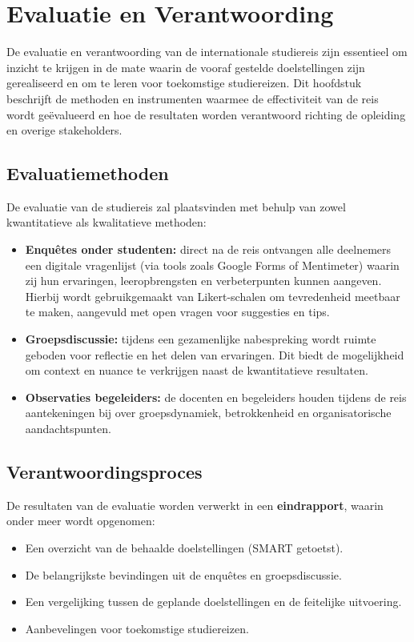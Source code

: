 \section{Evaluatie en Verantwoording}

De evaluatie en verantwoording van de internationale studiereis zijn essentieel om inzicht te krijgen in de mate waarin de vooraf gestelde doelstellingen zijn gerealiseerd en om te leren voor toekomstige studiereizen. Dit hoofdstuk beschrijft de methoden en instrumenten waarmee de effectiviteit van de reis wordt geëvalueerd en hoe de resultaten worden verantwoord richting de opleiding en overige stakeholders.

\subsection{Evaluatiemethoden}

De evaluatie van de studiereis zal plaatsvinden met behulp van zowel kwantitatieve als kwalitatieve methoden:

\begin{itemize}
	\item \textbf{Enquêtes onder studenten:} direct na de reis ontvangen alle deelnemers een digitale vragenlijst (via tools zoals Google Forms of Mentimeter) waarin zij hun ervaringen, leeropbrengsten en verbeterpunten kunnen aangeven. Hierbij wordt gebruikgemaakt van Likert-schalen om tevredenheid meetbaar te maken, aangevuld met open vragen voor suggesties en tips.
	\item \textbf{Groepsdiscussie:} tijdens een gezamenlijke nabespreking wordt ruimte geboden voor reflectie en het delen van ervaringen. Dit biedt de mogelijkheid om context en nuance te verkrijgen naast de kwantitatieve resultaten.
	\item \textbf{Observaties begeleiders:} de docenten en begeleiders houden tijdens de reis aantekeningen bij over groepsdynamiek, betrokkenheid en organisatorische aandachtspunten.
\end{itemize}

\subsection{Verantwoordingsproces}

De resultaten van de evaluatie worden verwerkt in een \textbf{eindrapport}, waarin onder meer wordt opgenomen:
\begin{itemize}
	\item Een overzicht van de behaalde doelstellingen (SMART getoetst).
	\item De belangrijkste bevindingen uit de enquêtes en groepsdiscussie.
	\item Een vergelijking tussen de geplande doelstellingen en de feitelijke uitvoering.
	\item Aanbevelingen voor toekomstige studiereizen.
\end{itemize}

